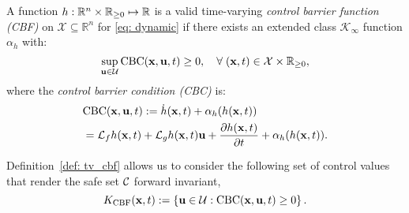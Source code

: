 \begin{definition}
\label{def: tv_cbf}
A function $h: \mathbb{R}^n \times \mathbb{R}_{\geq 0} \mapsto {\mathbb{R}}$ is a valid time-varying \emph{control barrier function (CBF)} on $\mathcal{X} \subseteq \mathbb{R}^n$ for \eqref{eq: dynamic} if there exists an extended class $\mathcal{K}_{\infty}$ function $\alpha_h$ with:
%
\begin{equation}\label{eq:tv_cbf}
    \sup_{\mathbf{u}\in \mathcal{U}} \text{CBC}(\mathbf{x},\mathbf{u}, t) \geq 0, \quad \forall \; (\mathbf{x},t) \in {\cal X} \times \mathbb{R}_{\geq 0},
\end{equation}
where the \emph{control barrier condition (CBC)} is:
\begin{equation}
\label{eq:tvcbc_define}
\begin{aligned}
    &\text{CBC}(\mathbf{x},\mathbf{u}, t) := \dot{h}(\mathbf{x}, t) + \alpha_h(h(\mathbf{x},t)) \\
    & = \mathcal{L}_f h(\mathbf{x}, t) + \mathcal{L}_g h(\mathbf{x}, t)\mathbf{u} + \frac{\partial h(\mathbf{x},t)}{\partial t} + \alpha_h(h(\mathbf{x},t)).
\end{aligned}
\end{equation}
\end{definition}



Definition~\ref{def: tv_cbf} allows us to consider the following set of control values that render the safe set ${\cal C}$ forward invariant, 
\begin{equation}
\label{eq: safe_control_set}
    K_{\text{CBF}}(\mathbf{x}, t) := \left \{  \mathbf{u} \in {\cal U}: \text{CBC}(\mathbf{x},\mathbf{u}, t) \geq 0 \right \}. 
\end{equation}



